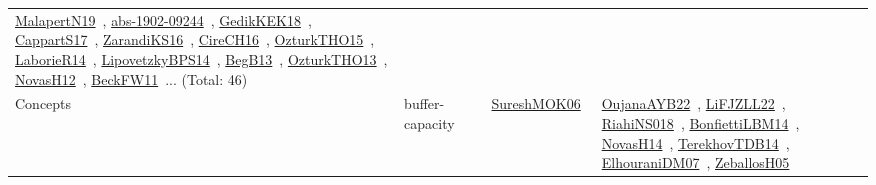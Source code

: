 {\begin{longtable}{lp{3cm}>{\raggedright\arraybackslash}p{6cm}>{\raggedright\arraybackslash}p{6cm}>{\raggedright\arraybackslash}p{8cm}}
\href{../works/MalapertN19.pdf}{MalapertN19}~\cite{MalapertN19}, \href{../works/abs-1902-09244.pdf}{abs-1902-09244}~\cite{abs-1902-09244}, \href{../works/GedikKEK18.pdf}{GedikKEK18}~\cite{GedikKEK18}, \href{../works/CappartS17.pdf}{CappartS17}~\cite{CappartS17}, \href{../works/ZarandiKS16.pdf}{ZarandiKS16}~\cite{ZarandiKS16}, \href{../works/CireCH16.pdf}{CireCH16}~\cite{CireCH16}, \href{../works/OzturkTHO15.pdf}{OzturkTHO15}~\cite{OzturkTHO15}, \href{../works/LaborieR14.pdf}{LaborieR14}~\cite{LaborieR14}, \href{../works/LipovetzkyBPS14.pdf}{LipovetzkyBPS14}~\cite{LipovetzkyBPS14}, \href{../works/BegB13.pdf}{BegB13}~\cite{BegB13}, \href{../works/OzturkTHO13.pdf}{OzturkTHO13}~\cite{OzturkTHO13}, \href{../works/NovasH12.pdf}{NovasH12}~\cite{NovasH12}, \href{../works/BeckFW11.pdf}{BeckFW11}~\cite{BeckFW11}... (Total: 46)\\
\index{buffer-capacity}\index{Concepts!buffer-capacity}Concepts & buffer-capacity &  & \href{../works/SureshMOK06.pdf}{SureshMOK06}~\cite{SureshMOK06} & \href{../works/OujanaAYB22.pdf}{OujanaAYB22}~\cite{OujanaAYB22}, \href{../works/LiFJZLL22.pdf}{LiFJZLL22}~\cite{LiFJZLL22}, \href{../works/RiahiNS018.pdf}{RiahiNS018}~\cite{RiahiNS018}, \href{../works/BonfiettiLBM14.pdf}{BonfiettiLBM14}~\cite{BonfiettiLBM14}, \href{../works/NovasH14.pdf}{NovasH14}~\cite{NovasH14}, \href{../works/TerekhovTDB14.pdf}{TerekhovTDB14}~\cite{TerekhovTDB14}, \href{../works/ElhouraniDM07.pdf}{ElhouraniDM07}~\cite{ElhouraniDM07}, \href{../works/ZeballosH05.pdf}{ZeballosH05}~\cite{ZeballosH05}\\

\end{longtable}}
